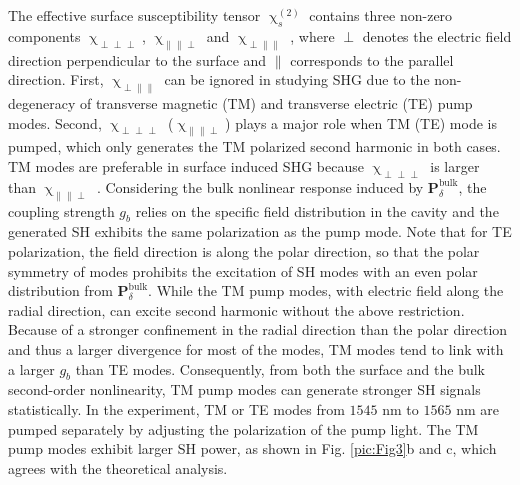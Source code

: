 \documentclass[a4paper,8pt,hyperref, twocolumn]{article}
\begin{document}
The effective surface susceptibility tensor $\upchi^{(2)}_s$ contains three non-zero components $\upchi_{\perp \perp \perp}$, $\upchi_{\parallel \parallel \perp}$ and $\upchi_{\perp \parallel \parallel}$ \cite{heinz1991second}, where $\perp$ denotes the electric field direction perpendicular to the surface and $\parallel$ corresponds to the parallel direction. 
First, $\upchi_{\perp \parallel \parallel}$ can be ignored in studying SHG due to the non-degeneracy of transverse magnetic (TM) and  transverse electric (TE) pump modes.  
Second, $\upchi_{\perp \perp \perp}$ ($\upchi_{\parallel \parallel \perp}$) plays a major role when TM (TE) mode is pumped, which only generates the TM polarized second harmonic in both cases. 
TM modes are preferable in surface induced SHG because $\upchi_{\perp \perp \perp}$ is larger than $\upchi_{\parallel \parallel \perp}$ \cite{rodriguez2008calibration}. 
Considering the bulk nonlinear response induced by $\mathbf{P}^{\mathrm{bulk}}_\delta$, the coupling strength $g_b$ relies on the specific field distribution in the cavity and the generated SH exhibits the same polarization as the pump mode. 
Note that for TE polarization, the field direction is along the polar direction, so that the polar symmetry of modes prohibits the excitation of SH modes with an even polar distribution from $\mathbf{P}^{\mathrm{bulk}}_\delta$. 
While the TM pump modes, with electric field along the radial direction, can excite second harmonic without the above restriction.
Because of a stronger confinement in the radial direction than the polar direction and thus a larger divergence for most of the modes, TM modes tend to link with a larger $g_b$ than TE modes. 
Consequently, from both the surface and the bulk second-order nonlinearity, TM pump modes can generate stronger SH signals statistically. 
In the experiment, TM or TE modes from $1545$ nm to $1565$ nm are pumped separately by adjusting the polarization of the pump light.
The TM pump modes exhibit larger SH power, as shown in Fig. \ref{pic:Fig3}b and c, which agrees with the theoretical analysis.
\end{document}
